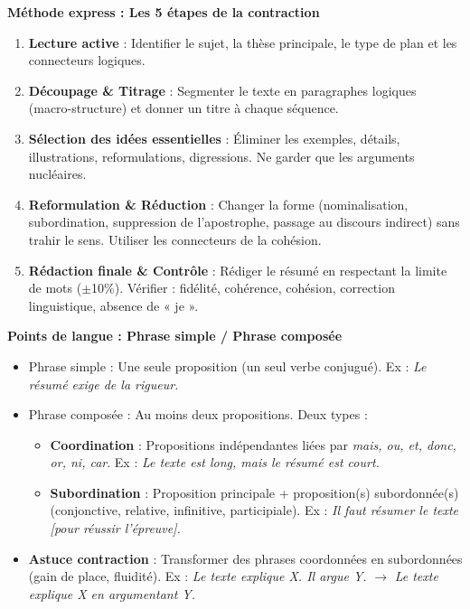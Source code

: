 \documentclass[11pt]{article}
\newcommand{\cle}[1]{{\popxbold\color{popdark}#1}}
\begin{document}
\begin{aretenir}
\textbf{Méthode express : Les 5 étapes de la contraction}
\begin{enumerate}
  \item \textbf{Lecture active} : Identifier le \cle{sujet}, la \cle{thèse} principale, le \cle{type de plan} et les \cle{connecteurs} logiques.
  \item \textbf{Découpage \& Titrage} : Segmenter le texte en paragraphes logiques (macro-structure) et donner un titre à chaque séquence.
  \item \textbf{Sélection des idées essentielles} : Éliminer les exemples, détails, illustrations, reformulations, digressions. Ne garder que les \cle{arguments nucléaires}.
  \item \textbf{Reformulation \& Réduction} : Changer la forme (nominalisation, subordination, suppression de l'apostrophe, passage au discours indirect) sans trahir le sens. Utiliser les \cle{connecteurs} de la cohésion.
  \item \textbf{Rédaction finale \& Contrôle} : Rédiger le résumé en respectant la \cle{limite de mots} ($\pm$10\%). Vérifier : fidélité, cohérence, cohésion, correction linguistique, absence de « je ».
\end{enumerate}

\textbf{Points de langue : Phrase simple / Phrase composée}
\begin{itemize}
  \item \cle{Phrase simple} : Une seule proposition (un seul verbe conjugué). Ex : \emph{Le résumé exige de la rigueur.}
  \item \cle{Phrase composée} : Au moins deux propositions. Deux types :
  \begin{itemize}
    \item \textbf{Coordination} : Propositions indépendantes liées par \emph{mais, ou, et, donc, or, ni, car}. Ex : \emph{Le texte est long, mais le résumé est court.}
    \item \textbf{Subordination} : Proposition principale + proposition(s) subordonnée(s) (conjonctive, relative, infinitive, participiale). Ex : \emph{Il faut résumer le texte [pour réussir l'épreuve].}
  \end{itemize}
  \item \textbf{Astuce contraction} : Transformer des phrases coordonnées en subordonnées (gain de place, fluidité). Ex : \emph{Le texte explique X. Il argue Y.} $\rightarrow$ \emph{Le texte explique X en argumentant Y.}
\end{itemize}


\end{aretenir}
\end{document}

